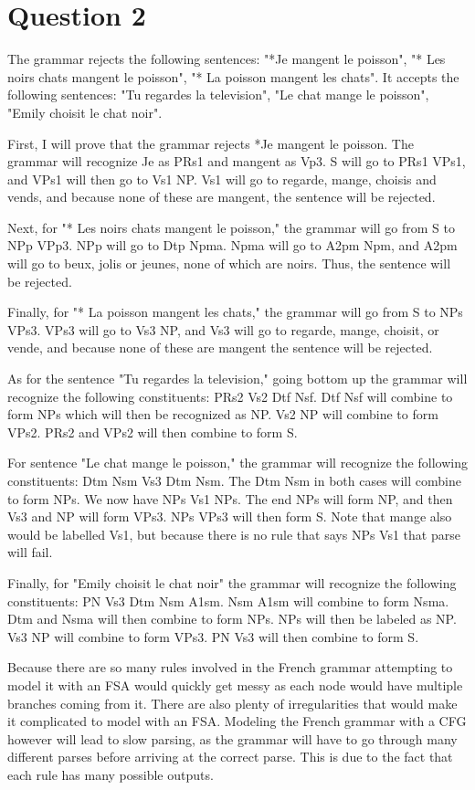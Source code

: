 \documentclass{article}
\begin{document}
\section{Question 2}

The grammar rejects the following sentences: "*Je mangent le poisson", "* Les noirs chats mangent le poisson", "* La poisson mangent les chats".  It accepts the following sentences: "Tu regardes la television", "Le chat mange le poisson", "Emily choisit le chat noir".\par
First, I will prove that the grammar rejects *Je mangent le poisson.  The grammar will recognize Je as PRs1 and mangent as Vp3.  S will go to PRs1 VPs1, and VPs1 will then go to Vs1 NP.  Vs1 will go to regarde, mange, choisis and vends, and because none of these are mangent, the sentence will be rejected.\par
Next, for  "* Les noirs chats mangent le poisson," the grammar will go from S to NPp VPp3.  NPp will go to Dtp Npma.  Npma will go to A2pm Npm, and A2pm will go to beux, jolis or jeunes, none of which are noirs.  Thus, the sentence will be rejected.\par
Finally, for "* La poisson mangent les chats," the grammar will go from S to NPs VPs3.  VPs3 will go to Vs3 NP, and Vs3 will go to regarde, mange, choisit, or vende, and because none of these are mangent the sentence will be rejected. \par
As for the sentence "Tu regardes la television," going bottom up the grammar will recognize the following constituents: PRs2 Vs2 Dtf Nsf.  Dtf Nsf will combine to form NPs which will then be recognized as NP.  Vs2  NP will combine to form VPs2.  PRs2 and VPs2 will then combine to form S.\par
For sentence "Le chat mange le poisson," the grammar will recognize the following constituents: Dtm Nsm Vs3 Dtm Nsm.  The Dtm Nsm in both cases will combine to form NPs.  We now have NPs Vs1 NPs.  The end NPs will form NP, and then Vs3 and NP will form VPs3.  NPs VPs3 will then form S.  Note that mange also would be labelled Vs1, but because there is no rule that says NPs Vs1 that parse will fail.\par
Finally, for "Emily choisit le chat noir" the grammar will recognize the following constituents: PN Vs3 Dtm Nsm A1sm.  Nsm A1sm will combine to form Nsma.  Dtm and Nsma will then combine to form NPs.  NPs will then be labeled as NP.  Vs3 NP will combine to form VPs3.  PN Vs3 will then combine to form S.\par
Because there are so many rules involved in the French grammar attempting to model it with an FSA would quickly get messy as each node would have multiple branches coming from it.  There are also plenty of irregularities that would make it complicated to model with an FSA.  Modeling the French grammar with a CFG however will lead to slow parsing, as the grammar will have to go through many different parses before arriving at the correct parse.  This is due to the fact that each rule has many possible outputs.\par
\end{document}
